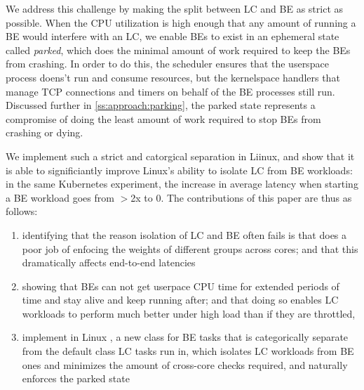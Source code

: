 We address this challenge by making the split between LC and BE as strict as
possible. When the CPU utilization is high enough that any amount of running a
BE would interfere with an LC, we enable BEs to exist in an ephemeral state
called \textit{parked}, which does the minimal amount of work required to keep
the BEs from crashing. In order to do this, the scheduler ensures that the
userspace process doens't run and consume resources, but the kernelspace
handlers that manage TCP connections and timers on behalf of the BE processes
still run. Discussed further in \autoref{ss:approach:parking}, the parked state
represents a compromise of doing the least amount of work required to stop BEs
from crashing or dying.

We implement such a strict and catorgical separation in Liinux, and show that it
is able to significiantly improve Linux's ability to isolate LC from BE
workloads: in the same Kubernetes experiment, the increase in average latency
when starting a BE workload goes from $>$2x to 0. The contributions of this
paper are thus as follows: 
\begin{enumerate}
    \item identifying that the reason isolation of LC and BE often fails is that
    \cgroups{} does a poor job of enfocing the weights of different groups
    across cores; and that this dramatically affects end-to-end latencies
    \item showing that BEs can not get userpace CPU time for extended periods of
    time and stay alive and keep running after; and that doing so enables LC
    workloads to perform much better under high load than if they are throttled,
    \item implement in Linux \schedbe{}, a new class for BE tasks that is
    categorically separate from the default class LC tasks run in, which
    isolates LC workloads from BE ones and minimizes the amount of cross-core
    checks required, and naturally enforces the parked state
\end{enumerate}
